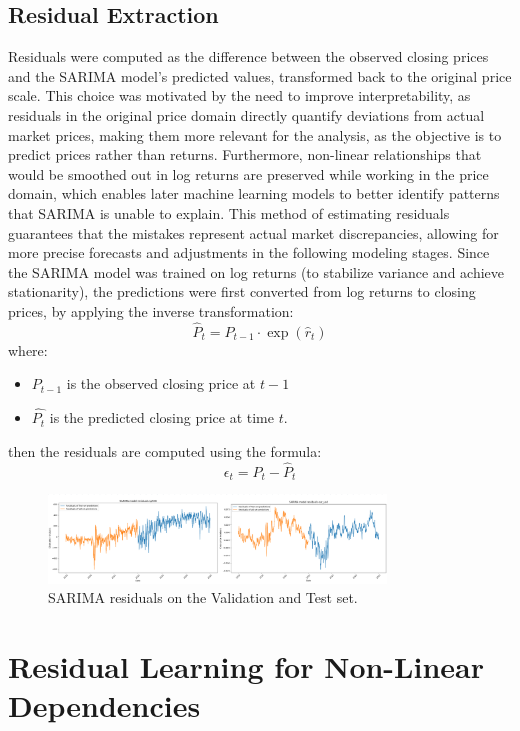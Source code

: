 \subsection{Residual Extraction}
Residuals were computed as the difference between the observed closing prices and the SARIMA model’s predicted values, transformed back to the original price scale. This choice was motivated by the need to improve interpretability, as residuals in the original price domain directly quantify deviations from actual market prices, making them more relevant for the analysis, as the objective is to predict prices rather than returns. Furthermore, non-linear relationships that would be smoothed out in log returns are preserved while working in the price domain, which enables later machine learning models to better identify patterns that SARIMA is unable to explain. This method of estimating residuals guarantees that the mistakes represent actual market discrepancies, allowing for more precise forecasts and adjustments in the following modeling stages. Since the SARIMA model was trained on log returns (to stabilize variance and achieve stationarity), the predictions were first converted from log returns to closing prices, by applying the inverse transformation:
\[
\hat{P}_t = P_{t-1} \cdot \exp(\hat{r}_t)
\]
where: 
\begin{itemize}
    \item \( P_{t-1} \) is the observed closing price at $t-1$
    \item \( \hat{P_t} \) is the predicted closing price at time $t$.
\end{itemize}
then the residuals are computed using the formula: 
\[
\epsilon_t = P_t - \hat{P}_t
\]
 \begin{figure}[H]
    \centering
    \includegraphics[width=0.8\textwidth]{Machine_learning_thesis/Images/SARIMA residuals.png}
    \caption{SARIMA residuals on the Validation and Test set.} 
    \label{fig:SARIMA residuals}
\end{figure}

\section{Residual Learning for Non-Linear Dependencies}

